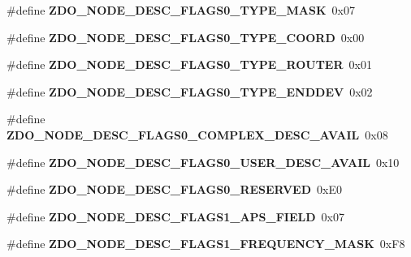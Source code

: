 \begin{DoxyCompactItemize}
\#define {\bfseries Z\+D\+O\+\_\+\+N\+O\+D\+E\+\_\+\+D\+E\+S\+C\+\_\+\+F\+L\+A\+G\+S0\+\_\+\+T\+Y\+P\+E\+\_\+\+M\+A\+SK}~0x07
\item 
\mbox{\label{group__zdo_ga045e2e1260aedda9d893eda672ff2759}} 
\#define {\bfseries Z\+D\+O\+\_\+\+N\+O\+D\+E\+\_\+\+D\+E\+S\+C\+\_\+\+F\+L\+A\+G\+S0\+\_\+\+T\+Y\+P\+E\+\_\+\+C\+O\+O\+RD}~0x00
\item 
\mbox{\label{group__zdo_ga638960e6443cf99ea580bda38247de6a}} 
\#define {\bfseries Z\+D\+O\+\_\+\+N\+O\+D\+E\+\_\+\+D\+E\+S\+C\+\_\+\+F\+L\+A\+G\+S0\+\_\+\+T\+Y\+P\+E\+\_\+\+R\+O\+U\+T\+ER}~0x01
\item 
\mbox{\label{group__zdo_ga73b2f81177df4b568597a7937903cdda}} 
\#define {\bfseries Z\+D\+O\+\_\+\+N\+O\+D\+E\+\_\+\+D\+E\+S\+C\+\_\+\+F\+L\+A\+G\+S0\+\_\+\+T\+Y\+P\+E\+\_\+\+E\+N\+D\+D\+EV}~0x02
\item 
\mbox{\label{group__zdo_gaccb1d140d777a88fcb71f107adcf4c0b}} 
\#define {\bfseries Z\+D\+O\+\_\+\+N\+O\+D\+E\+\_\+\+D\+E\+S\+C\+\_\+\+F\+L\+A\+G\+S0\+\_\+\+C\+O\+M\+P\+L\+E\+X\+\_\+\+D\+E\+S\+C\+\_\+\+A\+V\+A\+IL}~0x08
\item 
\mbox{\label{group__zdo_ga721ea4088a875ddddda53d88e0f2c1c4}} 
\#define {\bfseries Z\+D\+O\+\_\+\+N\+O\+D\+E\+\_\+\+D\+E\+S\+C\+\_\+\+F\+L\+A\+G\+S0\+\_\+\+U\+S\+E\+R\+\_\+\+D\+E\+S\+C\+\_\+\+A\+V\+A\+IL}~0x10
\item 
\mbox{\label{group__zdo_ga95e4053f203577f2b7b07d25bb7857a6}} 
\#define {\bfseries Z\+D\+O\+\_\+\+N\+O\+D\+E\+\_\+\+D\+E\+S\+C\+\_\+\+F\+L\+A\+G\+S0\+\_\+\+R\+E\+S\+E\+R\+V\+ED}~0x\+E0
\item 
\mbox{\label{group__zdo_ga4bf942f7cd1215c7981577a55b05bed0}} 
\#define {\bfseries Z\+D\+O\+\_\+\+N\+O\+D\+E\+\_\+\+D\+E\+S\+C\+\_\+\+F\+L\+A\+G\+S1\+\_\+\+A\+P\+S\+\_\+\+F\+I\+E\+LD}~0x07
\item 
\mbox{\label{group__zdo_ga55dcb5f623fc0cb8260955ab905256a9}} 
\#define {\bfseries Z\+D\+O\+\_\+\+N\+O\+D\+E\+\_\+\+D\+E\+S\+C\+\_\+\+F\+L\+A\+G\+S1\+\_\+\+F\+R\+E\+Q\+U\+E\+N\+C\+Y\+\_\+\+M\+A\+SK}~0x\+F8
\item 

\end{DoxyCompactItemize}
